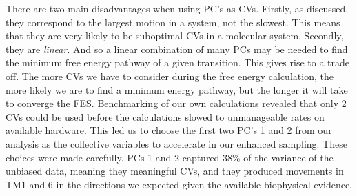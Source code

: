 There are two main disadvantages when using PC's as CVs. Firstly, as discussed, they correspond to the largest motion in a system, not the slowest. This means that they are very likely to be suboptimal CVs in a molecular system. Secondly, they are \textit{linear}. And so a linear combination of many PCs may be needed to find the minimum free energy pathway of a given transition. This gives rise to a trade off. The more CVs we have to consider during the free energy calculation, the more likely we are to find a minimum energy pathway, but the longer it will take to converge the FES. Benchmarking of our own calculations revealed that only 2 CVs could be used before the calculations slowed to unmanageable rates on available hardware. This led us to choose the first two PC's 1 and 2 from our analysis as the collective variables to accelerate in our enhanced sampling. These choices were made carefully. PCs 1 and 2 captured 38\% of the variance of the unbiased data, meaning they meaningful CVs, and they produced movements in TM1 and 6 in the directions we expected given the available biophysical evidence. 

